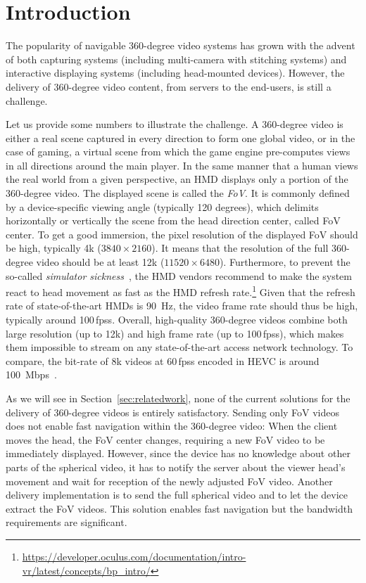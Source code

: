 \section{Introduction}
\label{sec:introduction}


The popularity of navigable 360-degree video systems
has grown with the advent of both capturing systems
(including multi-camera with stitching systems) and interactive displaying
systems (including head-mounted devices).
However, the delivery of 360-degree video content, from servers
to the end-users,
is still a challenge.

Let us provide some numbers to illustrate the challenge.
A 360-degree video is either a real scene captured in every direction
to form one global video, or in the case of gaming, a virtual scene from which the
game engine pre-computes views in all directions around the main player.
In the same manner that a human
views the real world from a given perspective, an \ac{HMD} displays only a portion
of the 360-degree video. The displayed scene is called the \textit{\ac{FoV}}. It is commonly
defined by
a device-specific viewing angle (typically 120 degrees), which delimits horizontally or
vertically the scene from the head direction center, called \ac{FoV} center. To get a good
immersion, the pixel
resolution of
the displayed \ac{FoV} should be high, typically 4k ($3840\times2160$). It means that
the resolution of the full 360-degree video should be at least 12k ($11520\times6480$).
Furthermore, to prevent the so-called \emph{simulator sickness}~\cite{moss2011characteristics}, the \ac{HMD}
vendors recommend to make the system react to head movement as fast as the \ac{HMD}
refresh rate.\footnote{\url{https://developer.oculus.com/documentation/intro-vr/latest/concepts/bp_intro/}} Given that the refresh rate of
state-of-the-art \acp{HMD} is \SI{90}{Hz}, the video frame rate should thus be high,
typically around 100\,\acp{fps}.
Overall, high-quality 360-degree videos combine both large resolution (up to 12k) and high
frame rate (up to 100\,\acp{fps}), which makes them impossible to stream on any
state-of-the-art access network technology. To compare, the bit-rate of 8k videos
at 60\,\acp{fps} encoded in \ac{HEVC} is around \SI{100}{Mbps}~\cite{7398367}.

As we will see in Section~\ref{sec:relatedwork}, none of the current solutions
for the delivery of 360-degree videos is entirely
satisfactory. Sending only FoV videos does
not enable fast
navigation within the 360-degree video: When the client moves the head, the FoV
center changes, requiring a new FoV video to be immediately displayed. However, since
the device has no knowledge about other parts of the spherical video, it has to notify
the server about the viewer head's movement and wait for reception of the newly
adjusted FoV video.
Another delivery implementation is to send the full spherical video
and to let the device
extract the \ac{FoV} videos. This solution enables fast navigation but the bandwidth
requirements are
significant.

